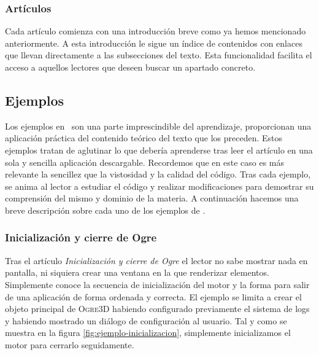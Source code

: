
\subsubsection{Artículos}

Cada artículo comienza con una introducción breve como ya hemos mencionado
anteriormente. A esta introducción le sigue un índice de contenidos con
enlaces que llevan directamente a las subsecciones del texto. Esta
funcionalidad
facilita el acceso a aquellos lectores que deseen buscar un apartado concreto.\\

\subsection{Ejemplos}

Los ejemplos en \wiki\ son una parte imprescindible del aprendizaje, proporcionan
una aplicación práctica del contenido teórico del texto que los preceden.
Estos ejemplos tratan de aglutinar lo que debería aprenderse tras leer el
artículo en una sola y sencilla aplicación descargable. Recordemos que en este
caso es más relevante la sencillez que la vistosidad y la calidad del código.
Tras cada ejemplo, se anima al lector a estudiar el código y realizar
modificaciones para demostrar su comprensión del mismo y dominio de la materia.
A continuación hacemos una breve descripción sobre cada uno de los ejemplos
de \wiki.\\

\subsubsection{Inicialización y cierre de Ogre}

Tras el artículo \textit{Inicialización y cierre de Ogre} el lector no sabe
mostrar nada en pantalla, ni siquiera crear una ventana en la que renderizar
elementos. Simplemente conoce la secuencia de inicialización del motor y
la forma para salir de una aplicación de forma ordenada y correcta. El ejemplo
se limita a crear el objeto principal de \textsc{Ogre3D} habiendo configurado
previamente el sistema de logs y habiendo mostrado un diálogo de configuración
al usuario. Tal y como se muestra en la figura \ref{fig:ejemplo-inicializacion},
simplemente inicializamos el motor para cerrarlo seguidamente.\\

